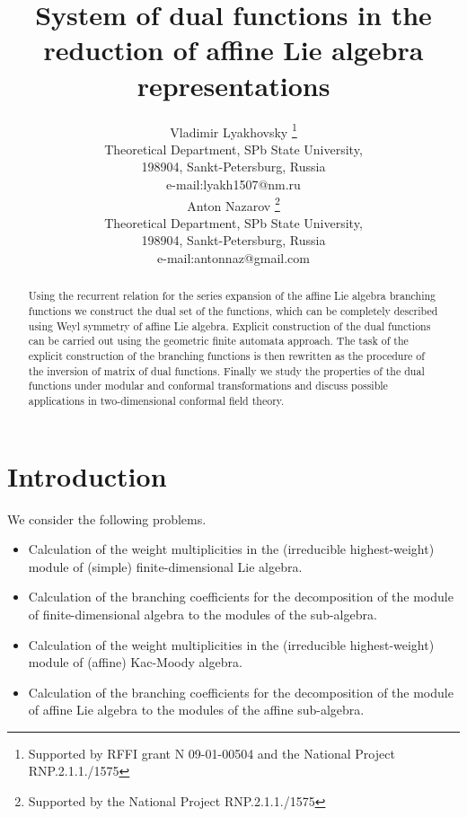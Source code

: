 \documentclass[a4paper,12pt]{article}
\theoremstyle{definition} \newtheorem{Def}{Definition}
\begin{document}
\title{\textbf{{\Large {System of dual functions in the reduction of affine Lie algebra representations}}}}
\author{Vladimir Lyakhovsky \thanks{ Supported by
 RFFI grant N 09-01-00504 and the National Project RNP.2.1.1./1575 }\\
Theoretical Department, SPb State University,\\
198904, Sankt-Petersburg, Russia \\
e-mail:lyakh1507@nm.ru \\
[5mm] Anton Nazarov \thanks{ Supported by
the National Project RNP.2.1.1./1575 }\\
Theoretical Department, SPb State University,\\
198904, Sankt-Petersburg, Russia \\
e-mail:antonnaz@gmail.com
}
\maketitle

\begin{abstract}
  Using the recurrent relation for the series expansion of the affine Lie algebra branching functions we construct the dual set of the functions, which can be completely described using Weyl symmetry of affine Lie algebra. Explicit construction of the dual functions can be carried out using the geometric finite automata approach. The task of the explicit construction of the branching functions is then rewritten as the procedure of the inversion of matrix of dual functions. Finally we study the properties of the dual functions under modular and conformal transformations and discuss possible applications in two-dimensional conformal field theory.
\end{abstract}

\section{Introduction}
\label{sec:introduction}

We consider the following problems.
\begin{itemize}
\item Calculation of the weight multiplicities in the (irreducible highest-weight) module of (simple) finite-dimensional Lie algebra.
\item Calculation of the branching coefficients for the decomposition of the module of finite-dimensional algebra to the modules of the sub-algebra.
\item Calculation of the weight multiplicities in the (irreducible highest-weight) module of (affine) Kac-Moody algebra.
\item Calculation of the branching coefficients for the decomposition of the module of affine Lie algebra to the modules of the affine sub-algebra.
\end{itemize}
\end{document}
